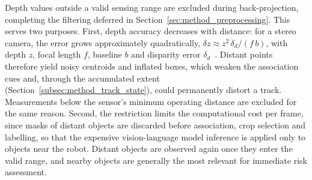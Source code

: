{Depth values outside a valid sensing range are excluded during back-projection, completing the filtering deferred in Section~\ref{sec:method_preprocessing}. This serves two purposes. First, depth accuracy decreases with distance: for a stereo camera, the error grows approximately quadratically, $\delta z \approx z^{2}\,\delta_{d} / (f\,b)$, with depth $z$, focal length $f$, baseline $b$ and disparity error $\delta_{d}$~\cite{keselman2017realsense}. Distant points therefore yield noisy centroids and inflated boxes, which weaken the association cues and, through the accumulated extent (Section~\ref{subsec:method_track_state}), could permanently distort a track. Measurements below the sensor's minimum operating distance are excluded for the same reason. Second, the restriction limits the computational cost per frame, since masks of distant objects are discarded before association, crop selection and labelling, so that the expensive vision-language model inference is applied only to objects near the robot. Distant objects are observed again once they enter the valid range, and nearby objects are generally the most relevant for immediate risk assessment.
\par}

